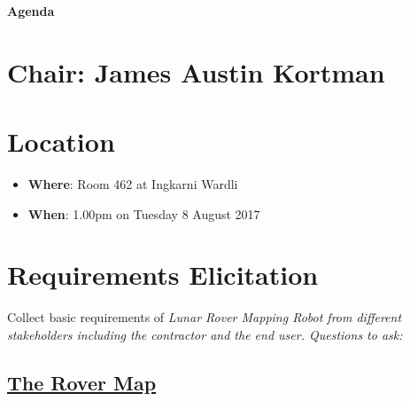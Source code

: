 \documentclass[11pt, a4paper]{article}
\begin{document}



\begin{center}
\huge \bf Agenda \\
\hrulefill
\end{center}



\section*{Chair: James Austin Kortman}

\vspace*{10pt}

\section{Location}
\begin{itemize}
\item[] \textbf{Where}: Room 462 at Ingkarni Wardli
\item[] \textbf{When}: 1.00pm on Tuesday 8 August 2017
\end{itemize}

\section{Requirements Elicitation}

Collect basic requirements of \em{Lunar Rover Mapping Robot} from different stakeholders including the contractor and the end user. Questions to ask: 

\subsection{\underline{The Rover Map}}
\end{document}
